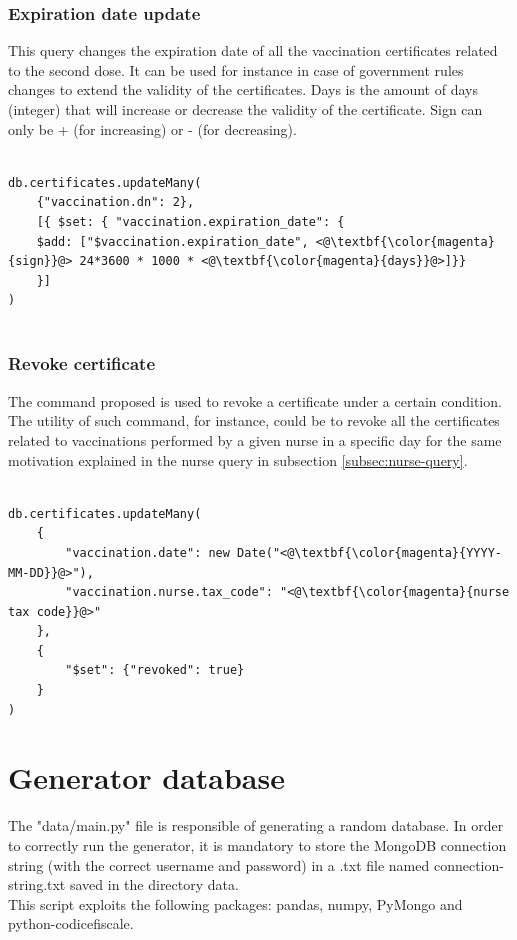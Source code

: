 \documentclass{article}
\begin{document}
\subsubsection{Expiration date update}
This query changes the expiration date of all the vaccination certificates related to the second dose. It can be used for instance in case of government rules changes to extend the validity of the certificates.
Days is the amount of days (integer) that will increase or decrease the validity of the certificate. Sign can only be + (for increasing) or - (for decreasing).

\begin{lstlisting}[language=cypher, label=lst:cypher-example]

db.certificates.updateMany(
    {"vaccination.dn": 2},
    [{ $set: { "vaccination.expiration_date": {
    $add: ["$vaccination.expiration_date", <@\textbf{\color{magenta}{sign}}@> 24*3600 * 1000 * <@\textbf{\color{magenta}{days}}@>]}}
    }]
)


\end{lstlisting}
\subsubsection{Revoke certificate}
The command proposed is used to revoke a certificate under a certain condition.
The utility of such command, for instance, could be to revoke all the certificates related to vaccinations performed by a given nurse in a specific day for the same motivation
explained in the nurse query in subsection \ref{subsec:nurse-query}.

\begin{lstlisting}[language=cypher, label=lst:cypher-example]

db.certificates.updateMany(
    {
        "vaccination.date": new Date("<@\textbf{\color{magenta}{YYYY-MM-DD}}@>"),
        "vaccination.nurse.tax_code": "<@\textbf{\color{magenta}{nurse tax code}}@>"
    },
    {
        "$set": {"revoked": true}
    }
)

\end{lstlisting}
\newpage
\section{Generator database}
The {\selectfont"data/main.py"} file is responsible of generating a random database.
In order to correctly run the generator, it is mandatory to store the MongoDB connection string (with the correct username and password) in a .txt file named {\selectfont connection-string.txt} saved in the directory {\selectfont data}.
\\This script exploits the following packages: {\selectfont pandas, numpy, PyMongo and python-codicefiscale}.
\end{document}
